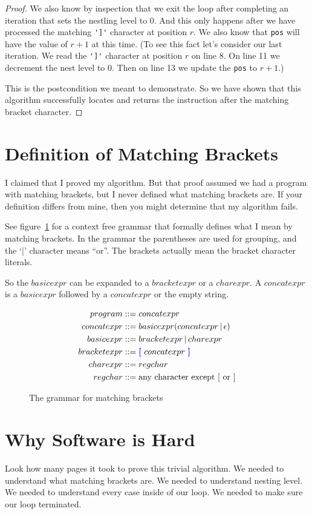 \documentclass[10pt]{amsart}
\newcommand{\inl}{\lstinline[breaklines=true]}
\newcommand{\defined}{\mathrel{\text{::=}}}
\newcommand{\navyblue}{\color{blue}}
\begin{document}
\begin{proof}
We also know by inspection that we exit the loop after completing an iteration
that sets the nestling level to 0.  And this only happens after we have
processed the matching \inl!']'! character at position $r$. We also know that
\inl!pos! will have the value of $r+1$ at this time. (To see this fact let's
consider our last iteration. We read the \inl!']'! character at position $r$ on
line 8. On line 11 we decrement the nest level to 0. Then on line 13 we update
the \inl!pos! to $r+1$.) 

This is the postcondition we meant to demonstrate. So we have shown that this
algorithm successfully locates and returns the instruction after the matching
bracket character.
\end{proof}

\section*{Definition of Matching Brackets}
I claimed that I proved my algorithm. But that proof assumed we had a 
program with matching brackets, but I never defined what matching brackets
are. If your definition differs from mine, then you might determine
that my algorithm fails.

See figure~\ref{fig:grammar} for a context free grammar that formally defines
what I mean by matching brackets. In the grammar the parentheses are used
for grouping, and the `|' character means ``or''. The brackets actually
mean the bracket character literals.

So the $basicexpr$ can be expanded to a $bracketexpr$ or a $charexpr$. A
$concatexpr$ is a $basicexpr$ followed by a $concatexpr$ or the empty string.


\begin{figure}
\caption{The grammar for matching brackets}
\label{fig:grammar}
\begin{align*}
program & \defined concatexpr \\
concatexpr & \defined basicexpr (concatexpr \mathop{|} \epsilon) \\
basicexpr & \defined bracketexpr \mathop{|} charexpr \\
bracketexpr & \defined \text{{\navyblue \bf[} }concatexpr\text{
    {\navyblue\bf]}} \\
charexpr & \defined regchar \\
regchar & \defined \text{any character except [ or ]}
\end{align*}
\end{figure}

\section*{Why Software is Hard}
Look how many pages it took to prove this trivial algorithm. We needed
to understand what matching brackets are. We needed to understand nesting level.
We needed to understand every case inside of our loop. We needed to make
sure our loop terminated.
\end{document}
